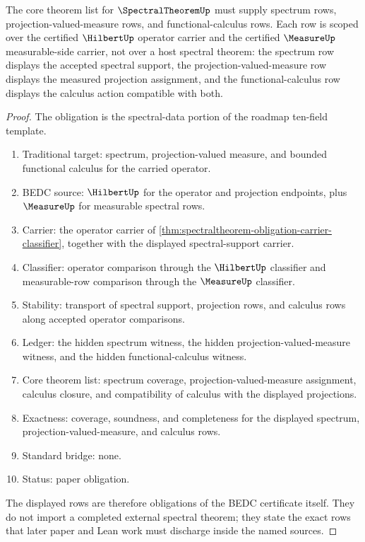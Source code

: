 \begin{theorem}
\label{thm:spectraltheorem-obligation-spectrum-pvm-functional-calculus}
The core theorem list for $\SpectralTheoremUp$ must supply spectrum rows, projection-valued-measure rows, and functional-calculus rows. Each row is scoped over the certified $\HilbertUp$ operator carrier and the certified $\MeasureUp$ measurable-side carrier, not over a host spectral theorem: the spectrum row displays the accepted spectral support, the projection-valued-measure row displays the measured projection assignment, and the functional-calculus row displays the calculus action compatible with both.
\end{theorem}
\begin{proof}
The obligation is the spectral-data portion of the roadmap ten-field template.
\begin{enumerate}
  \item Traditional target: spectrum, projection-valued measure, and bounded functional calculus for the carried operator.
  \item BEDC source: $\HilbertUp$ for the operator and projection endpoints, plus $\MeasureUp$ for measurable spectral rows.
  \item Carrier: the operator carrier of \autoref{thm:spectraltheorem-obligation-carrier-classifier}, together with the displayed spectral-support carrier.
  \item Classifier: operator comparison through the $\HilbertUp$ classifier and measurable-row comparison through the $\MeasureUp$ classifier.
  \item Stability: transport of spectral support, projection rows, and calculus rows along accepted operator comparisons.
  \item Ledger: the hidden spectrum witness, the hidden projection-valued-measure witness, and the hidden functional-calculus witness.
  \item Core theorem list: spectrum coverage, projection-valued-measure assignment, calculus closure, and compatibility of calculus with the displayed projections.
  \item Exactness: coverage, soundness, and completeness for the displayed spectrum, projection-valued-measure, and calculus rows.
  \item Standard bridge: none.
  \item Status: paper obligation.
\end{enumerate}

The displayed rows are therefore obligations of the BEDC certificate itself. They do not import a completed external spectral theorem; they state the exact rows that later paper and Lean work must discharge inside the named sources.
\end{proof}

